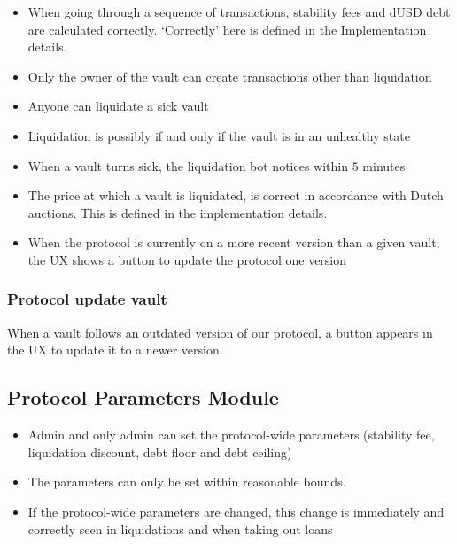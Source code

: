 \documentclass{article} %
\begin{document}
\begin{itemize}
% 
  \item When going through a sequence of transactions, stability fees and dUSD
    debt are calculated correctly. `Correctly' here is defined in the
    Implementation details.
  \item Only the owner of the vault can create transactions other than
    liquidation
  \item Anyone can liquidate a sick vault
  \item Liquidation is possibly if and only if the vault is in an unhealthy
    state
  \item When a vault turns sick, the liquidation bot notices within $5$ minutes
  \item The price at which a vault is liquidated, is correct in accordance with
    Dutch auctions. This is defined in the implementation details.
  \item When the protocol is currently on a more recent version than a given
    vault, the UX shows a button to update the protocol one version
\end{itemize}


\subsubsection*{Protocol update vault}

When a vault follows an outdated version of our protocol, a button appears in
the UX to update it to a newer version.

\subsection{Protocol Parameters Module}

\begin{itemize}
  \item Admin and only admin can set the protocol-wide parameters (stability
    fee, liquidation discount, debt floor and debt ceiling)
  \item The parameters can only be set within reasonable bounds. 
  \item If the protocol-wide parameters are changed, this change is immediately
    and correctly seen in liquidations and when taking out loans
\end{itemize}  
\end{document}
